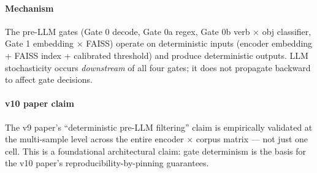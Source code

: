\documentclass[journal]{IEEEtran}
\begin{document}
\begin{table}[!t]
    \centering
    \caption{Universal pre-LLM gate determinism: Bypass\% standard deviation is 0.0000 in every cell across $n{=}5$ samples. Every sample of every cell produces an identical bypass count.}
    \label{tab:phase1g_s19_determinism}
\end{table}

\paragraph{Mechanism}
The pre-LLM gates (Gate 0 decode, Gate 0a regex, Gate 0b verb $\times$ obj classifier, Gate 1 embedding $\times$ FAISS) operate on deterministic inputs (encoder embedding + FAISS index + calibrated threshold) and produce deterministic outputs. LLM stochasticity occurs \textit{downstream} of all four gates; it does not propagate backward to affect gate decisions.

\paragraph{v10 paper claim}
The v9 paper's ``deterministic pre-LLM filtering'' claim is empirically validated at the multi-sample level across the entire encoder $\times$ corpus matrix --- not just one cell. This is a foundational architectural claim: gate determinism is the basis for the v10 paper's reproducibility-by-pinning guarantees.
\end{document}
